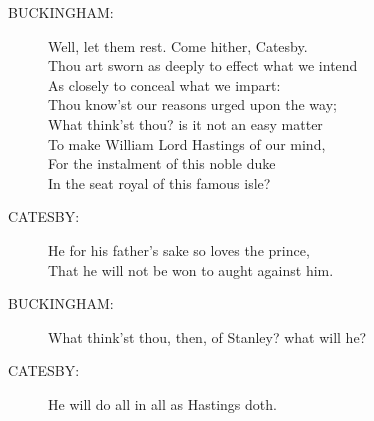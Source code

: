 \documentclass{article}
\begin{document}
\begin{description}
\item[BUCKINGHAM:] 
\hspace{1pt}Well, let them rest. Come hither, Catesby.\\
\hspace{1pt}Thou art sworn as deeply to effect what we intend\\
\hspace{1pt}As closely to conceal what we impart:\\
\hspace{1pt}Thou know'st our reasons urged upon the way;\\
\hspace{1pt}What think'st thou? is it not an easy matter\\
\hspace{1pt}To make William Lord Hastings of our mind,\\
\hspace{1pt}For the instalment of this noble duke\\
\hspace{1pt}In the seat royal of this famous isle?\\
\end{description}
\begin{description}
\item[CATESBY:] 
\hspace{1pt}He for his father's sake so loves the prince,\\
\hspace{1pt}That he will not be won to aught against him.\\
\end{description}
\begin{description}
\item[BUCKINGHAM:] 
\hspace{1pt}What think'st thou, then, of Stanley? what will he?\\
\end{description}
\begin{description}
\item[CATESBY:] 
\hspace{1pt}He will do all in all as Hastings doth.\\
\end{description}
\end{document}
